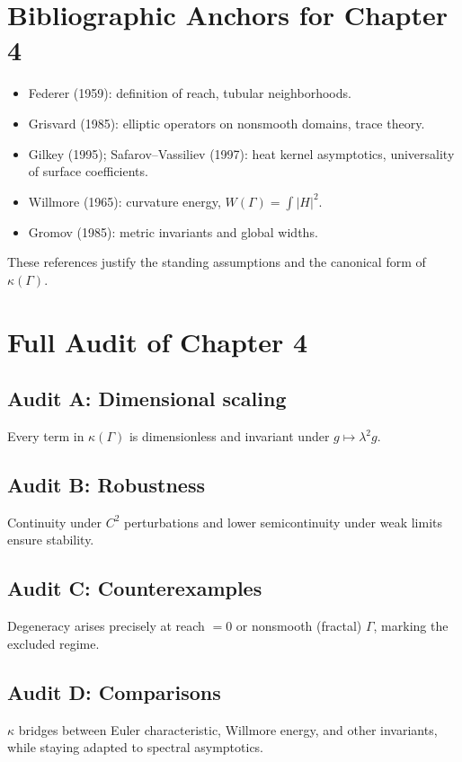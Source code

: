 \section{Bibliographic Anchors for Chapter 4}
\label{sec:biblio-ch4}

\begin{itemize}
  \item Federer (1959): definition of reach, tubular neighborhoods.
  \item Grisvard (1985): elliptic operators on nonsmooth domains, trace theory.
  \item Gilkey (1995); Safarov–Vassiliev (1997): heat kernel asymptotics, universality of surface coefficients.
  \item Willmore (1965): curvature energy, $W(\Gamma)=\int |H|^2$.
  \item Gromov (1985): metric invariants and global widths.
\end{itemize}

These references justify the standing assumptions and the canonical form of $\kappa(\Gamma)$.

\section{Full Audit of Chapter 4}
\label{sec:audit-ch4}

\subsection*{Audit A: Dimensional scaling}
Every term in $\kappa(\Gamma)$ is dimensionless and invariant under $g\mapsto \lambda^2 g$.

\subsection*{Audit B: Robustness}
Continuity under $C^2$ perturbations and lower semicontinuity under weak limits ensure stability.

\subsection*{Audit C: Counterexamples}
Degeneracy arises precisely at reach $=0$ or nonsmooth (fractal) $\Gamma$, marking the excluded regime.

\subsection*{Audit D: Comparisons}
$\kappa$ bridges between Euler characteristic, Willmore energy, and other invariants, while staying adapted to spectral asymptotics.

